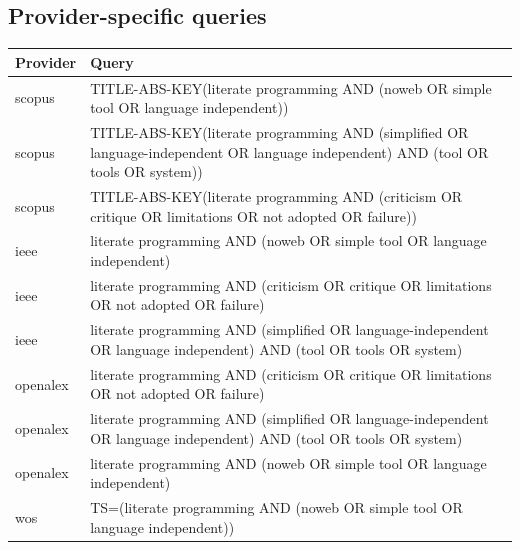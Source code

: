 \documentclass{article}
\begin{document}
\subsection{Provider-specific queries}
\begin{longtable}{lp{10cm}}
\toprule
Provider & Query \\
\midrule
scopus & TITLE-ABS-KEY(\textquotedbl{}literate programming\textquotedbl{} AND (noweb OR \textquotedbl{}simple tool\textquotedbl{} OR \textquotedbl{}language independent\textquotedbl{})) \\
scopus & TITLE-ABS-KEY(\textquotedbl{}literate programming\textquotedbl{} AND (simplified OR \textquotedbl{}language-independent\textquotedbl{} OR \textquotedbl{}language independent\textquotedbl{}) AND (tool OR tools OR system)) \\
scopus & TITLE-ABS-KEY(\textquotedbl{}literate programming\textquotedbl{} AND (criticism OR critique OR limitations OR \textquotedbl{}not adopted\textquotedbl{} OR failure)) \\
ieee & \textquotedbl{}literate programming\textquotedbl{} AND (noweb OR \textquotedbl{}simple tool\textquotedbl{} OR \textquotedbl{}language independent\textquotedbl{}) \\
ieee & \textquotedbl{}literate programming\textquotedbl{} AND (criticism OR critique OR limitations OR \textquotedbl{}not adopted\textquotedbl{} OR failure) \\
ieee & \textquotedbl{}literate programming\textquotedbl{} AND (simplified OR \textquotedbl{}language-independent\textquotedbl{} OR \textquotedbl{}language independent\textquotedbl{}) AND (tool OR tools OR system) \\
openalex & \textquotedbl{}literate programming\textquotedbl{} AND (criticism OR critique OR limitations OR \textquotedbl{}not adopted\textquotedbl{} OR failure) \\
openalex & \textquotedbl{}literate programming\textquotedbl{} AND (simplified OR \textquotedbl{}language-independent\textquotedbl{} OR \textquotedbl{}language independent\textquotedbl{}) AND (tool OR tools OR system) \\
openalex & \textquotedbl{}literate programming\textquotedbl{} AND (noweb OR \textquotedbl{}simple tool\textquotedbl{} OR \textquotedbl{}language independent\textquotedbl{}) \\
wos & TS=(\textquotedbl{}literate programming\textquotedbl{} AND (noweb OR \textquotedbl{}simple tool\textquotedbl{} OR \textquotedbl{}language independent\textquotedbl{})) \\

\end{longtable}
\end{document}
